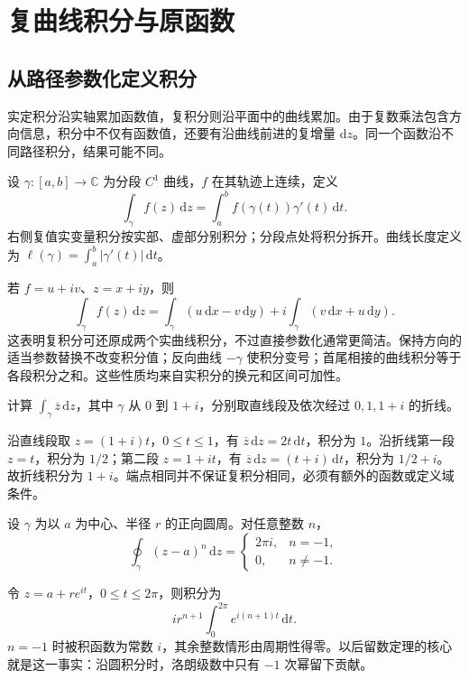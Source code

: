 \documentclass[UTF8,12pt,a4paper,fontset=fandol]{ctexbook}
\begin{document}
\chapter{复曲线积分与原函数}
\label{chap:cv-integral}

\section{从路径参数化定义积分}

实定积分沿实轴累加函数值，复积分则沿平面中的曲线累加。由于复数乘法包含方向信息，积分中不仅有函数值，还要有沿曲线前进的复增量 $\mathrm dz$。同一个函数沿不同路径积分，结果可能不同。

\begin{definition}[复曲线积分]
设 $\gamma:[a,b]\to\mathbb C$ 为分段 $C^1$ 曲线，$f$ 在其轨迹上连续，定义
\begin{equation}
 \int_\gamma f(z)\,\mathrm dz
 =\int_a^b f(\gamma(t))\gamma'(t)\,\mathrm dt.
 \label{eq:cv-path-integral}
\end{equation}
右侧复值实变量积分按实部、虚部分别积分；分段点处将积分拆开。曲线长度定义为 $\ell(\gamma)=\int_a^b|\gamma'(t)|\,\mathrm dt$。
\end{definition}

若 $f=u+iv$、$z=x+iy$，则
\[
 \int_\gamma f(z)\,\mathrm dz
 =\int_\gamma(u\,\mathrm dx-v\,\mathrm dy)
 +i\int_\gamma(v\,\mathrm dx+u\,\mathrm dy).
\]
这表明复积分可还原成两个实曲线积分，不过直接参数化通常更简洁。保持方向的适当参数替换不改变积分值；反向曲线 $-\gamma$ 使积分变号；首尾相接的曲线积分等于各段积分之和。这些性质均来自实积分的换元和区间可加性。

\begin{example}
计算 $\int_\gamma\overline z\,\mathrm dz$，其中 $\gamma$ 从 $0$ 到 $1+i$，分别取直线段及依次经过 $0,1,1+i$ 的折线。
\end{example}
\begin{solve}
沿直线段取 $z=(1+i)t$，$0\le t\le1$，有 $\overline z\,\mathrm dz=2t\,\mathrm dt$，积分为 $1$。沿折线第一段 $z=t$，积分为 $1/2$；第二段 $z=1+it$，有 $\overline z\,\mathrm dz=(t+i)\,\mathrm dt$，积分为 $1/2+i$。故折线积分为 $1+i$。端点相同并不保证复积分相同，必须有额外的函数或定义域条件。
\end{solve}

\begin{example}[圆周积分的基本模型]
\label{ex:cv-circle-power}
设 $\gamma$ 为以 $a$ 为中心、半径 $r$ 的正向圆周。对任意整数 $n$，
\begin{equation}
 \oint_\gamma(z-a)^n\,\mathrm dz
 =\begin{cases}2\pi i,&n=-1,\\0,&n\ne-1.\end{cases}
 \label{eq:cv-circle-power}
\end{equation}
\end{example}
\begin{solve}
令 $z=a+re^{it}$，$0\le t\le2\pi$，则积分为
\[
 ir^{n+1}\int_0^{2\pi}e^{i(n+1)t}\,\mathrm dt.
\]
$n=-1$ 时被积函数为常数 $i$，其余整数情形由周期性得零。以后留数定理的核心就是这一事实：沿圆积分时，洛朗级数中只有 $-1$ 次幂留下贡献。
\end{solve}
\end{document}
